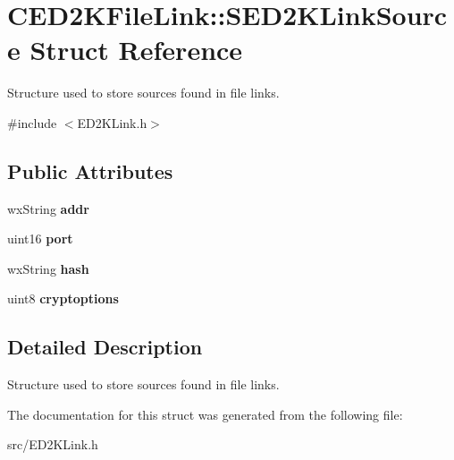\section{CED2KFileLink::SED2KLinkSource Struct Reference}
\label{structCED2KFileLink_1_1SED2KLinkSource}


Structure used to store sources found in file links.  


{\ttfamily \#include $<$ED2KLink.h$>$}\subsection*{Public Attributes}
\begin{DoxyCompactItemize}
\item 
wxString {\bf addr}\label{structCED2KFileLink_1_1SED2KLinkSource_a476c22f3975f786a9e8aac12314154c7}

\item 
uint16 {\bf port}\label{structCED2KFileLink_1_1SED2KLinkSource_a94924dd07eb3dc041b21cabc8ced9114}

\item 
wxString {\bf hash}\label{structCED2KFileLink_1_1SED2KLinkSource_a79a7adb661bba4d6695c993e17dbbd34}

\item 
uint8 {\bf cryptoptions}\label{structCED2KFileLink_1_1SED2KLinkSource_a9644ab0bcb2e0415dd9b1add39e43492}

\end{DoxyCompactItemize}


\subsection{Detailed Description}
Structure used to store sources found in file links. 

The documentation for this struct was generated from the following file:\begin{DoxyCompactItemize}
\item 
src/ED2KLink.h\end{DoxyCompactItemize}
